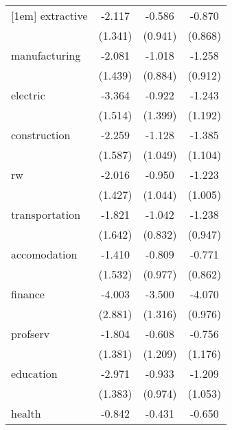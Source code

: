 {\begin{tabular}{l*{3}{c}}
[1em]
extractive  &      -2.117         &      -0.586         &      -0.870         \\
            &     (1.341)         &     (0.941)         &     (0.868)         \\
[1em]
manufacturing&      -2.081         &      -1.018         &      -1.258         \\
            &     (1.439)         &     (0.884)         &     (0.912)         \\
[1em]
electric    &      -3.364\sym{**} &      -0.922         &      -1.243         \\
            &     (1.514)         &     (1.399)         &     (1.192)         \\
[1em]
construction&      -2.259         &      -1.128         &      -1.385         \\
            &     (1.587)         &     (1.049)         &     (1.104)         \\
[1em]
rw          &      -2.016         &      -0.950         &      -1.223         \\
            &     (1.427)         &     (1.044)         &     (1.005)         \\
[1em]
transportation&      -1.821         &      -1.042         &      -1.238         \\
            &     (1.642)         &     (0.832)         &     (0.947)         \\
[1em]
accomodation&      -1.410         &      -0.809         &      -0.771         \\
            &     (1.532)         &     (0.977)         &     (0.862)         \\
[1em]
finance     &      -4.003         &      -3.500\sym{**} &      -4.070\sym{***}\\
            &     (2.881)         &     (1.316)         &     (0.976)         \\
[1em]
profserv    &      -1.804         &      -0.608         &      -0.756         \\
            &     (1.381)         &     (1.209)         &     (1.176)         \\
[1em]
education   &      -2.971\sym{**} &      -0.933         &      -1.209         \\
            &     (1.383)         &     (0.974)         &     (1.053)         \\
[1em]
health      &      -0.842         &      -0.431         &      -0.650         \\

\end{tabular}}
